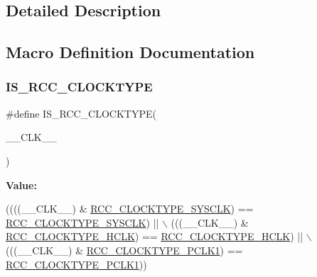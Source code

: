 \subsection{Detailed Description}


\subsection{Macro Definition Documentation}
\mbox{\label{group___r_c_c___private___macros_ga5639cc7f37f0cb7ce1e5d0f3918a48ba}} 
\subsubsection{\texorpdfstring{I\+S\+\_\+\+R\+C\+C\+\_\+\+C\+L\+O\+C\+K\+T\+Y\+PE}{IS\_RCC\_CLOCKTYPE}}
{\footnotesize\ttfamily \#define I\+S\+\_\+\+R\+C\+C\+\_\+\+C\+L\+O\+C\+K\+T\+Y\+PE(\begin{DoxyParamCaption}\item[{}]{\+\_\+\+\_\+\+C\+L\+K\+\_\+\+\_\+ }\end{DoxyParamCaption})}

{\bfseries Value\+:}
\begin{DoxyCode}
((((\_\_CLK\_\_) & \hyperlink{group___r_c_c___system___clock___type_ga7e721f5bf3fe925f78dae0356165332e}{RCC\_CLOCKTYPE\_SYSCLK}) == \hyperlink{group___r_c_c___system___clock___type_ga7e721f5bf3fe925f78dae0356165332e}{RCC\_CLOCKTYPE\_SYSCLK}) || \(\backslash\)
                                   (((\_\_CLK\_\_) & \hyperlink{group___r_c_c___system___clock___type_gaa5330efbd790632856a2b15851517ef9}{RCC\_CLOCKTYPE\_HCLK})   == 
      \hyperlink{group___r_c_c___system___clock___type_gaa5330efbd790632856a2b15851517ef9}{RCC\_CLOCKTYPE\_HCLK})   || \(\backslash\)
                                   (((\_\_CLK\_\_) & \hyperlink{group___r_c_c___system___clock___type_gab00c7b70f0770a616be4b5df45a454c4}{RCC\_CLOCKTYPE\_PCLK1})  == 
      \hyperlink{group___r_c_c___system___clock___type_gab00c7b70f0770a616be4b5df45a454c4}{RCC\_CLOCKTYPE\_PCLK1}))
\end{DoxyCode}
\mbox{\label{group___r_c_c___private___macros_ga0f01b4d9e55bcb7fcbd2c08f6d7bb5b3}} 
